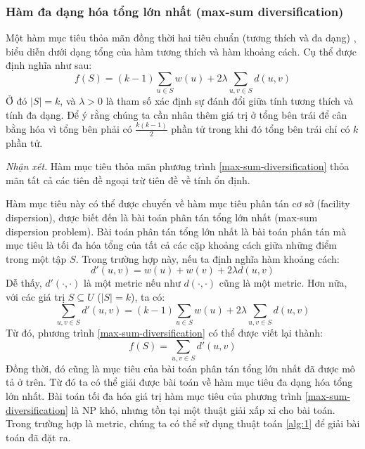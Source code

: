 \documentclass[12pt]{report}
\begin{document}
\subsubsection{Hàm đa dạng hóa tổng lớn nhất (max-sum diversification)}
Một hàm mục tiêu thỏa mãn đồng thời hai tiêu chuẩn (tương thích và đa dạng)
, biểu diễn dưới dạng tổng của hàm tương thích và hàm khoảng cách. Cụ thể 
được định nghĩa như sau: 
\begin{equation}
\label{max-sum-diversification}
f(S) = (k - 1) \sum_{u \in S} w(u) + 2 \lambda \sum_{u, v \in S} d(u, v)
\end{equation}
Ở đó $|S| = k$, và $\lambda > 0$ là tham số xác định sự đánh đổi giữa tính 
tương thích và tính đa dạng. Để ý rằng chúng ta cần nhân thêm giá trị 
ở tổng bên trái để cân bằng hóa vì tổng bên phải có
$\frac{k(k - 1)}{2}$ phần tử trong khi đó tổng bên 
trái chỉ có $k$ phần tử.

\textit{Nhận xét}. Hàm mục tiêu thỏa mãn phương trình 
\ref{max-sum-diversification} thỏa mãn tất cả các tiên đề ngoại trừ tiên đề
về tính ổn định. 

Hàm mục tiêu này có thể được chuyển về hàm mục tiêu phân tán cơ sở 
(facility dispersion), được biết đến là bài toán phân tán tổng lớn nhất
(max-sum dispersion problem). 
Bài toán phân tán tổng lớn nhất là bài toán phân tán mà mục tiêu 
là tối đa hóa tổng của 
tất cả các cặp khoảng cách giữa những điểm trong một tập $S$.
Trong trường hợp này, nếu ta định nghĩa hàm khoảng cách: 
\begin{equation}
\label{new-distance-msd}
    d'(u, v) = w(u) + w(v) + 2\lambda d(u, v)
\end{equation}
Dễ thấy, $d'(\cdot, \cdot)$ là một metric nếu như $d(\cdot, \cdot)$ 
cũng là một metric. Hơn nữa, với các giá trị 
$S \subseteq U$  ($|S| = k$), ta có: 
$$
    \sum_{u, v \in S} d'(u, v) = 
    (k - 1) \sum_{u \in S} w(u) +
    2 \lambda \sum_{u, v \in S} d(u, v)
$$
Từ đó, phương trình \ref{max-sum-diversification} có thể được viết lại 
thành: 
$$
f(S) = \sum_{u, v \in S} d'(u, v)
$$
Đồng thời, đó cũng là mục tiêu của bài toán phân tán tổng lớn nhất 
đã được mô tả ở trên. Từ đó ta có thể giải được bài toán 
về hàm mục tiêu
đa dạng hóa tổng lớn nhất. Bài toán tối đa hóa giá trị hàm mục tiêu của 
phương trình \ref{max-sum-diversification} là NP khó, nhưng tồn tại một 
thuật giải xấp xỉ cho bài toán. 
Trong trường hợp là metric, chúng ta có thể sử dụng 
thuật toán \ref{alg:1} để giải bài 
toán đã đặt ra. 
\end{document}
